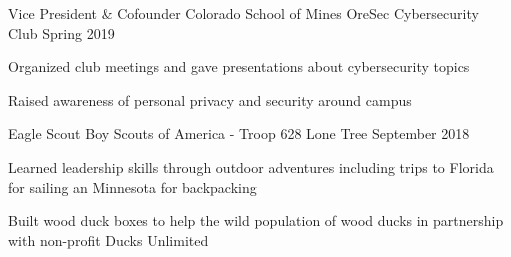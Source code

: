 \vspace{-2.0mm}

\begin{cventries}

  \cventry
    {Vice President \& Cofounder} %
    {Colorado School of Mines OreSec Cybersecurity Club} %
    {} %
    {Spring 2019} %
    {
      \begin{cvitems} %
        \item {Organized club meetings and gave presentations about
            cybersecurity topics}
        \item {Raised awareness of personal privacy and security around campus}
      \end{cvitems}
    }

  \cventry
    {Eagle Scout} %
    {Boy Scouts of America - Troop 628} %
    {Lone Tree} %
    {September 2018} %
    {
      \begin{cvitems} %
        \item {Learned leadership skills through outdoor adventures
            including trips to Florida for sailing an Minnesota for
            backpacking}
        \item {Built wood duck boxes to help the wild population of
            wood ducks in partnership with non-profit Ducks Unlimited}
      \end{cvitems}
    }

\end{cventries}
